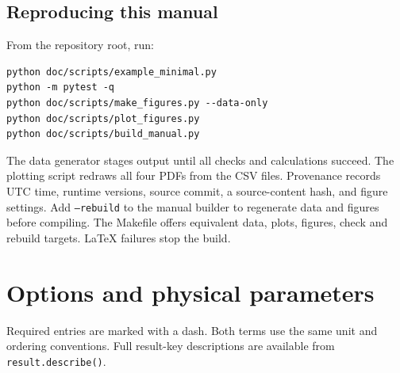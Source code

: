 \documentclass[11pt,a4paper]{article}
\newcommand{\code}[1]{\texttt{#1}}
\numberwithin{equation}{section}
\begin{document}
\subsection{Reproducing this manual}
From the repository root, run:
\begin{verbatim}
python doc/scripts/example_minimal.py
python -m pytest -q
python doc/scripts/make_figures.py --data-only
python doc/scripts/plot_figures.py
python doc/scripts/build_manual.py
\end{verbatim}
The data generator stages output until all checks and calculations succeed. The plotting script redraws all four PDFs from the CSV files. Provenance records UTC time, runtime versions, source commit, a source-content hash, and figure settings. Add \code{--rebuild} to the manual builder to regenerate data and figures before compiling. The Makefile offers equivalent data, plots, figures, check and rebuild targets. LaTeX failures stop the build.

\appendix
\clearpage
\section{Options and physical parameters}\label{app:options}

Required entries are marked with a dash. Both terms use the same unit
and ordering conventions. Full result-key descriptions are available from
\code{result.describe()}.
\end{document}
